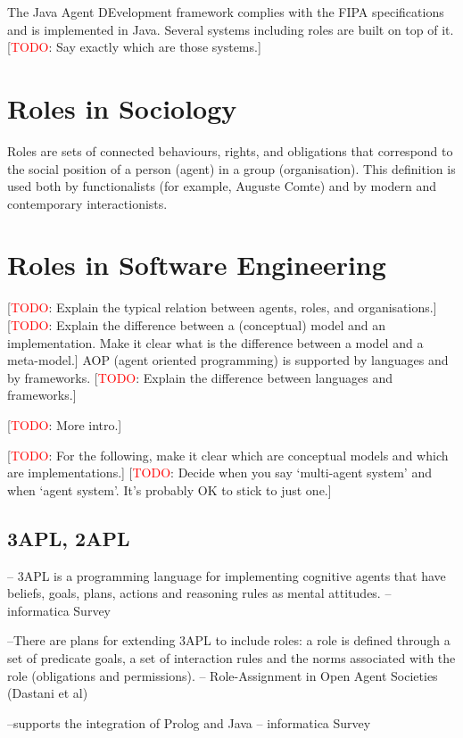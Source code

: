 \documentclass{article}
\newcommand{\todo}[1]{[\textcolor{red}{TODO}: #1]}
\begin{document}
The Java Agent DEvelopment framework complies with the FIPA
specifications and is implemented in Java. Several systems
including roles are built on top of it. \todo{Say exactly which
are those systems.}
\section{Roles in Sociology}

Roles are sets of connected behaviours, rights, and obligations
that correspond to the social position of a person (agent) in a
group (organisation). This definition is used both by functionalists
(for example, Auguste Comte) and by modern and contemporary
interactionists.
\section{Roles in Software Engineering}
\label{sec:software_engineering}

\todo{Explain the typical relation between agents, roles, and
  organisations.}
\todo{Explain the difference between a (conceptual) model and an
  implementation. Make it clear what is the difference between a
  model and a meta-model.}
AOP (agent oriented programming) is supported by languages and by
frameworks.  \todo{Explain the difference between languages and
frameworks.}


\todo{More intro.}

\todo{For the following, make it clear which are conceptual models and
  which are implementations.}
\todo{Decide when you say `multi-agent system' and when `agent system'.
  It's probably OK to stick to just one.}

\subsection{3APL, 2APL}

-- 3APL is a programming language for implementing cognitive agents that have
beliefs, goals, plans, actions and reasoning rules as mental attitudes. --
informatica Survey

--There are plans for extending 3APL to include roles: a role is defined
through a set of predicate goals, a set of interaction rules and the norms
associated with the role (obligations and permissions). -- Role-Assignment in
Open Agent Societies (Dastani et al)

--supports the integration of Prolog and Java -- informatica Survey
\end{document}
